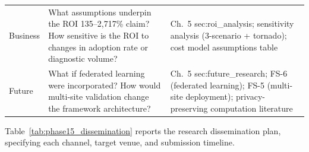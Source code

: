 \begin{xltabular}{\textwidth}{@{} l X X @{}}
\addlinespace
Business           & What assumptions underpin the ROI 135--2{,}717\% claim? How sensitive is the ROI to changes in adoption rate or diagnostic volume?                                                         & Ch.~5 sec:roi\_analysis; sensitivity analysis (3-scenario + tornado); cost model assumptions table \\
\addlinespace
Future             & What if federated learning were incorporated? How would multi-site validation change the framework architecture?                                                                   & Ch.~5 sec:future\_research; FS-6 (federated learning); FS-5 (multi-site deployment); privacy-preserving computation literature \\
\end{xltabular}
\endgroup

\vspace{1.5em}

Table~\ref{tab:phase15_dissemination} reports the research dissemination plan, specifying each channel, target venue, and submission timeline.

